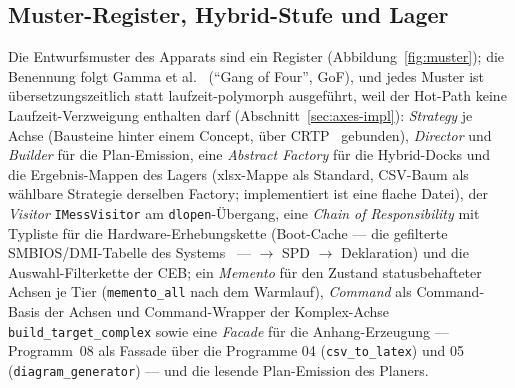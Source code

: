 \begin{nurkurz}
\subsection{Muster-Register, Hybrid-Stufe und Lager}\label{sec:impl-hybrid-lager}
Die Entwurfsmuster des Apparats sind ein Register (Abbildung~\ref{fig:muster}); die Benennung folgt Gamma
et al.~\cite{gamma1994patterns} (\enquote{Gang of Four}, GoF), und jedes Muster ist übersetzungszeitlich
statt laufzeit-polymorph ausgeführt, weil der Hot-Path keine Laufzeit-Verzweigung enthalten darf
(Abschnitt~\ref{sec:axes-impl}): \emph{Strategy} je Achse (Bausteine hinter einem Concept, über
CRTP~\cite{coplien1995crtp} gebunden), \emph{Director} und \emph{Builder} für die Plan-Emission, eine
\emph{Abstract Factory} für die Hybrid-Docks und die Ergebnis-Mappen des Lagers (xlsx-Mappe als Standard,
CSV-Baum als wählbare Strategie derselben Factory; implementiert ist eine flache Datei), der
\emph{Visitor} \texttt{IMessVisitor} am \texttt{dlopen}-Übergang, eine \emph{Chain of Responsibility} mit
Typliste für die Hardware-Erhebungskette (Boot-Cache --- die gefilterte SMBIOS/DMI-Tabelle des
Systems~\cite{dmtf_smbios} --- $\to$ SPD $\to$ Deklaration) und die Auswahl-Filterkette der CEB\@; ein
\emph{Memento} für den Zustand statusbehafteter Achsen je Tier (\texttt{memento\_all} nach dem Warmlauf),
\emph{Command} als Command-Basis der Achsen und Command-Wrapper der Komplex-Achse
\texttt{build\_target\_complex} sowie eine \emph{Facade} für die Anhang-Erzeugung --- Programm~08 als
Fassade über die Programme 04 (\texttt{csv\_to\_latex}) und 05 (\texttt{diagram\_generator}) --- und die
lesende Plan-Emission des Planers.
\begin{figure}[htbp]\centering
\end{figure}
\end{nurkurz}
